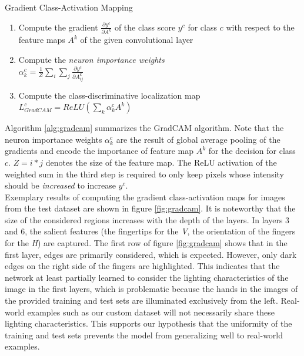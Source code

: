 \documentclass[a4paper]{article}
\begin{document}
\begin{algorithm}
     \caption{Gradient Class-Activation Mapping}
     \label{alg:gradcam}
     \begin{enumerate}
          \item Compute the gradient $\frac{\partial y^c}{\partial A^k}$ of the class score $y^c$ for class $c$ with respect to the feature maps $A^k$ of the given convolutional layer
          \item Compute the \textit{neuron importance weights}\\ $\alpha^c_k = \frac{1}{Z} \sum_i \sum_j \frac{\partial y^c}{\partial A^k_{ij}}$
          \item Compute the class-discriminative localization map\\
          $L^c_{GradCAM} = ReLU(\sum_k \alpha_k^c A^k)$
     \end{enumerate}
\end{algorithm}
Algorithm \ref{alg:gradcam} summarizes the GradCAM algorithm. Note that the neuron importance weights $\alpha_k^c$ are the result of global average pooling of the gradients and encode the importance of feature map $A^k$ for the decision for class $c$. $Z = i*j$ denotes the size of the feature map. The ReLU activation of the weighted sum in the third step is required to only keep pixels whose intensity should be \textit{increased} to increase $y^c$.\\
Exemplary results of computing the gradient class-activation maps for images from the test dataset are shown in figure \ref{fig:gradcam}. It is noteworthy that the size of the considered regions increases with the depth of the layers. In layers 3 and 6, the salient features (the fingertips for the \textit{V}, the orientation of the fingers for the \textit{H}) are captured. The first row of figure \ref{fig:gradcam} shows that in the first layer, edges are primarily considered, which is expected. However, only dark edges on the right side of the fingers are highlighted. This indicates that the network at least partially learned to consider the lighting characteristics of the image in the first layers, which is problematic because the hands in the images of the provided training and test sets are illuminated exclusively from the left. Real-world examples such as our custom dataset will not necessarily share these lighting characteristics. This supports our hypothesis that the uniformity of the training and test sets prevents the model from generalizing well to real-world examples.
\end{document}
